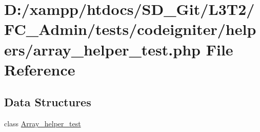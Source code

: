 \hypertarget{array__helper__test_8php}{}\section{D\+:/xampp/htdocs/\+S\+D\+\_\+\+Git/\+L3\+T2/\+F\+C\+\_\+\+Admin/tests/codeigniter/helpers/array\+\_\+helper\+\_\+test.php File Reference}
\label{array__helper__test_8php}
\subsection*{Data Structures}
\begin{DoxyCompactItemize}
\item 
class \hyperlink{class_array__helper__test}{Array\+\_\+helper\+\_\+test}
\end{DoxyCompactItemize}

